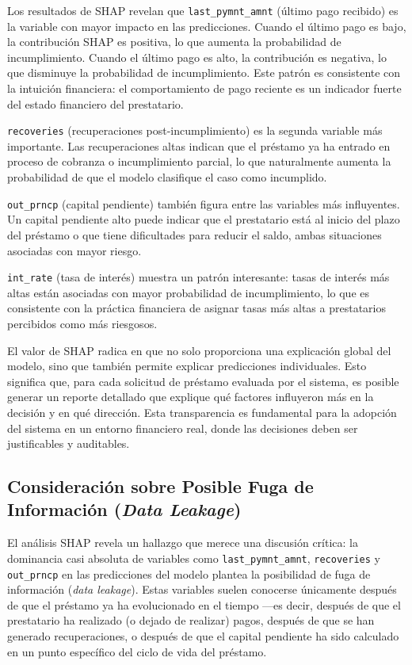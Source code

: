 \documentclass[12pt,a4paper]{article}
\begin{document}
Los resultados de SHAP revelan que \texttt{last\_pymnt\_amnt} (último pago recibido) es la variable con mayor impacto en las predicciones. Cuando el último pago es bajo, la contribución SHAP es positiva, lo que aumenta la probabilidad de incumplimiento. Cuando el último pago es alto, la contribución es negativa, lo que disminuye la probabilidad de incumplimiento. Este patrón es consistente con la intuición financiera: el comportamiento de pago reciente es un indicador fuerte del estado financiero del prestatario.

\texttt{recoveries} (recuperaciones post-incumplimiento) es la segunda variable más importante. Las recuperaciones altas indican que el préstamo ya ha entrado en proceso de cobranza o incumplimiento parcial, lo que naturalmente aumenta la probabilidad de que el modelo clasifique el caso como incumplido.

\texttt{out\_prncp} (capital pendiente) también figura entre las variables más influyentes. Un capital pendiente alto puede indicar que el prestatario está al inicio del plazo del préstamo o que tiene dificultades para reducir el saldo, ambas situaciones asociadas con mayor riesgo.

\texttt{int\_rate} (tasa de interés) muestra un patrón interesante: tasas de interés más altas están asociadas con mayor probabilidad de incumplimiento, lo que es consistente con la práctica financiera de asignar tasas más altas a prestatarios percibidos como más riesgosos.

El valor de SHAP radica en que no solo proporciona una explicación global del modelo, sino que también permite explicar predicciones individuales. Esto significa que, para cada solicitud de préstamo evaluada por el sistema, es posible generar un reporte detallado que explique qué factores influyeron más en la decisión y en qué dirección. Esta transparencia es fundamental para la adopción del sistema en un entorno financiero real, donde las decisiones deben ser justificables y auditables.

\subsection{Consideración sobre Posible Fuga de Información (\textit{Data Leakage})}

El análisis SHAP revela un hallazgo que merece una discusión crítica: la dominancia casi absoluta de variables como \texttt{last\_pymnt\_amnt}, \texttt{recoveries} y \texttt{out\_prncp} en las predicciones del modelo plantea la posibilidad de fuga de información (\textit{data leakage}). Estas variables suelen conocerse únicamente después de que el préstamo ya ha evolucionado en el tiempo ---es decir, después de que el prestatario ha realizado (o dejado de realizar) pagos, después de que se han generado recuperaciones, o después de que el capital pendiente ha sido calculado en un punto específico del ciclo de vida del préstamo.
\end{document}
